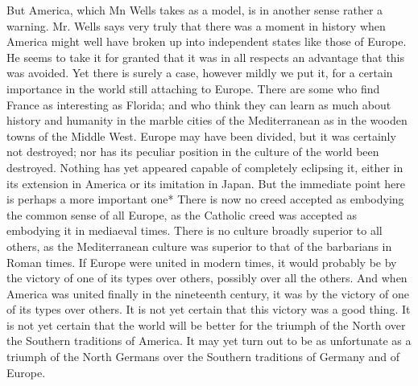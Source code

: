 \documentclass{book}
\begin{document}
But America, which Mn Wells takes as a model, is in another sense rather a warning. Mr. Wells says very truly that there was a moment in history when America might well have broken up into independent states like those of Europe. He seems to take it for granted that it was in all respects an advantage that this was avoided. Yet there is surely a case, however mildly we put it, for a certain importance in the world still attaching to Europe. There are some who find France as interesting as Florida; and who think they can learn as much about history and humanity in the marble cities of the Mediterranean as in the wooden towns of the Middle West. Europe may have been divided, but it was certainly not destroyed; nor has its peculiar position in the culture of the world been destroyed. Nothing has yet appeared capable of completely eclipsing it, either in its extension in America or its imitation in Japan. But the immediate point here is perhaps a more important one* There is now no creed accepted as embodying the common sense of all Europe, as the Catholic creed was accepted as embodying it in mediaeval times. There is no culture broadly superior to all others, as the Mediterranean culture was superior to that of the barbarians in Roman times. If Europe were united in modern times, it would probably be by the victory of one of its types over others, possibly over all the others. And when America was united finally in the nineteenth century, it was by the victory of one of its types over others. It is not yet certain that this victory was a good thing. It is not yet certain that the world will be better for the triumph of the North over the Southern traditions of America. It may yet turn out to be as unfortunate as a triumph of the North Germans over the Southern traditions of Germany and of Europe.
\end{document}
